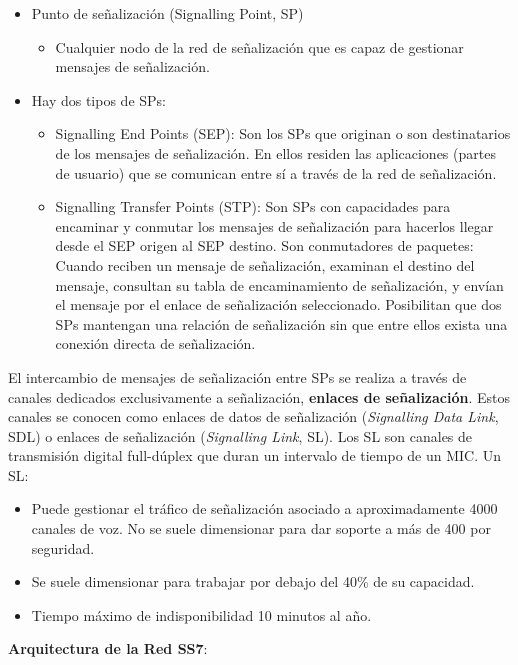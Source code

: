 \documentclass[10pt,portrait, twocolumn]{article}
\begin{document}
	\begin{itemize}
	\item Punto de señalización (Signalling Point, SP)
		\begin{itemize}
		\item Cualquier nodo de la red de señalización que es capaz de gestionar mensajes de señalización.
		\end{itemize}
	\item Hay dos tipos de SPs:
		\begin{itemize}
		\item Signalling End Points (SEP): Son los SPs que originan o son destinatarios de los mensajes de señalización. En ellos residen las aplicaciones (partes de usuario) que se comunican entre sí a través de la red de señalización.
		\item Signalling Transfer Points (STP): Son SPs con capacidades para encaminar y conmutar los mensajes de señalización para hacerlos llegar desde el SEP origen al SEP destino. Son conmutadores de paquetes: Cuando reciben un mensaje de señalización, examinan el destino del mensaje, consultan su tabla de encaminamiento de señalización, y envían el mensaje por el enlace de señalización seleccionado. Posibilitan que dos SPs mantengan una relación de señalización sin que entre ellos exista una conexión directa de señalización.
		\end{itemize}
	\end{itemize}


El intercambio de mensajes de señalización entre SPs se realiza a través de canales dedicados exclusivamente a señalización, \textbf{enlaces de señalización}. Estos canales se conocen como enlaces de datos de señalización (\textit{Signalling Data Link}, SDL) o enlaces de señalización (\textit{Signalling Link}, SL). Los SL son canales de transmisión digital full-dúplex que duran un intervalo de tiempo de un MIC. Un SL:

	\begin{itemize}
	\item Puede gestionar el tráfico de señalización asociado a aproximadamente 4000 canales de voz. No se suele dimensionar para dar soporte a más de 400 por seguridad.
	\item Se suele dimensionar para trabajar por debajo del 40\% de su capacidad.
	\item Tiempo máximo de indisponibilidad 10 minutos al año.
	\end{itemize}
	
\textbf{Arquitectura de la Red SS7}:
\end{document}
